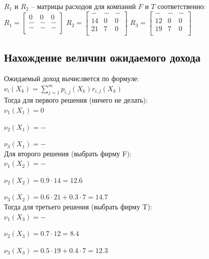 $R_1$ и $R_2$ -- матрицы расходов для компаний $F$ и $T$ соответственно:
\\

$
R_1=\begin{bmatrix}
0 & 0 & 0 \\
- & - & - \\
- & - & - \\
\end{bmatrix}
$
$
R_2=\begin{bmatrix}
- & - & - \\
14 & 0 & 0 \\
21 & 7 & 0 \\
\end{bmatrix}
$
$
R_3=\begin{bmatrix}
- & - & - \\
12 & 0 & 0 \\
19 & 7 & 0 \\
\end{bmatrix}
$\\

\subsection{Нахождение величин ожидаемого дохода}

Ожидаемый доход вычисляется по формуле:\\

$\nu_i(X_{k})=\sum_{j=1}^{m}p_{i,j}(X_{k})r_{i,j}(X_{k})$\\

Тогда для первого решения (ничего не делать):\\

$\nu_1(X_1)=0$

$\nu_2(X_1)=-$

$\nu_3(X_1)=-$\\

Для второго решения (выбрать фирму F):\\

$\nu_1(X_2)=-$

$\nu_2(X_2)=0.9\cdot 14=12.6$

$\nu_3(X_2)=0.6\cdot 21+0.3\cdot 7=14.7$\\

Тогда для третьего решения (выбрать фирму T):\\

$\nu_1(X_3)=-$

$\nu_2(X_3)=0.7\cdot 12=8.4$

$\nu_3(X_3)=0.5\cdot 19+0.4\cdot 7=12.3$\\


